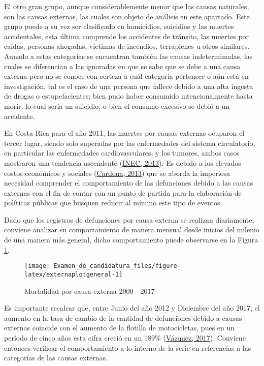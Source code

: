 \documentclass[
]{article}
\begin{document}
El otro gran grupo, aunque considerablemente menor que las causas
naturales, son las causas externas, las cuales son objeto de análisis en
este apartado. Este grupo puede a su vez ser clasificado en homicidios,
suicidios y las muertes accidentales, esta última comprende los
accidentes de tránsito, las muertes por caídas, personas ahogadas,
víctimas de incendios, terraplenes u otros similares. Aunado a estas
categorías se encuentran también las causas indeterminadas, las cuales
se diferencian a las ignoradas en que se sabe que se debe a una causa
externa pero no se conoce con certeza a cuál categoría pertenece o aún
está en investigación, tal es el caso de una persona que fallece debido
a una alta ingesta de drogas o estupefacientes; bien pudo haber
consumido intencionalmente hasta morir, lo cual sería un suicidio, o
bien el consumo excesivo se debió a un accidente.

En Costa Rica para el año 2011, las muertes por causas externas ocuparon
el tercer lugar, siendo solo superadas por las enfermedades del sistema
circulatorio, en particular las enfermedades cardiovasculares, y los
tumores, ambos casos mostraron una tendencia ascendente
(\protect\hyperlink{ref-nacion}{INEC, 2013}). Es debido a los elevados
costos económicos y sociales
(\protect\hyperlink{ref-ccpexternas}{Cardona, 2013}) que se aborda la
imperiosa necesidad comprender el comportamiento de las defunciones
debido a las causas externas con el fin de contar con un punto de
partida para la elaboración de políticas públicas que busquen reducir al
mínimo este tipo de eventos.

Dado que los registros de defunciones por causa externa se realizan
diariamente, conviene analizar su comportamiento de manera mensual desde
inicios del milenio de una manera más general, dicho comportamiento
puede observarse en la Figura \ref{fig:externaplotgeneral}.

\begin{figure}[H]
\texttt{[image: Examen\_de\_candidatura\_files/figure-latex/externaplotgeneral-1]} \caption{Mortalidad por causa externa 2000 - 2017}\label{fig:externaplotgeneral}
\end{figure}

Es importante recalcar que, entre Junio del año 2012 y Diciembre del año
2017, el aumento en la tasa de cambio de la cantidad de defunciones
debido a causas externas coincide con el aumento de la flotilla de
motocicletas, pues en un período de cinco años esta cifra creció en un
189\% (\protect\hyperlink{ref-motos}{Vázquez, 2017}). Conviene entonces
verificar el comportamiento a lo interno de la serie en referencias a
las categorías de las causas externas.
\end{document}
